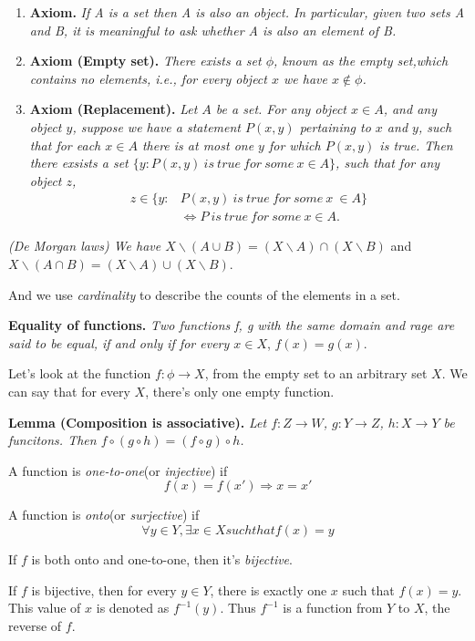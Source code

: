 \documentclass{article}
\begin{document}
\begin{enumerate}
	\item{
	      \textbf{Axiom.}
	      \emph{If A is a set then A is also an object.
		      In particular, given two sets A and B, it is meaningful to ask whether A is also an element of B.}
	      }
	\item{
	      \textbf{Axiom (Empty set).}
	      \emph{There exists a set \(\phi\), known as the empty set,which contains no elements, i.e., for every object \(x\) we have \(x \notin \phi\).}}
	\item{
	      \textbf{Axiom (Replacement).}
	      \emph{Let \(A\) be a set. For any object \(x \in A\), and any object \(y\), suppose we have a statement \(P(x, y)\) pertaining to \(x\) and \(y\),
		      such that for each \(x \in A\) there is at most one \(y\) for which \(P(x, y)\) is true.
		      Then there exsists a set \(\{y: P(x, y)\ is\ true\ for\ some\ x \in A\}\), such that for any object \(z\),
	      }
	      \[\begin{aligned}
			      z \in \{ y:{} & P(x, y)\ is\ true\ for\ some\ x\ \in A \}        \\
			                    & \Leftrightarrow P\ is\ true\ for\ some\ x \in A.
		      \end{aligned}\]
	      }
\end{enumerate}

\emph{(De Morgan laws) We have
	\(X \backslash (A \cup B) = (X \backslash A) \cap (X \backslash B)\)} and \(X \backslash (A \cap B) = (X \backslash A) \cup (X \backslash B)\).

And we use \emph{cardinality} to describe the counts of the elements in a set.


\textbf{Equality of functions.} \emph{Two functions f, g with the same domain and rage are said to be equal, if and only if for every \(x \in X\)}, \(f(x) = g(x)\).

Let's look at the function \(f: \phi \rightarrow X\), from the empty set to an arbitrary set \(X\).
We can say that for every \(X\), there's only one empty function.

\textbf{Lemma (Composition is associative).} \emph{
	Let \(f: Z \rightarrow W\), \(g: Y \rightarrow Z\), \(h: X \rightarrow Y\) be funcitons.
	Then \(f \circ (g \circ h)=(f \circ g) \circ h\).
}

A function is \emph{one-to-one}(or \emph{injective}) if \[
	f(x) = f(x') \Rightarrow x = x'
\]

A function is \emph{onto}(or \emph{surjective}) if \[
	\forall y \in Y, \exists x \in X such that f(x) = y
\]

If \(f\) is both onto and one-to-one, then it's \emph{bijective}.

If \(f\) is bijective, then for every \(y \in Y\), there is exactly one \(x\) such that \(f(x) = y\).
This value of \(x\) is denoted as \(f^{-1}(y)\).
Thus \(f^{-1}\) is a function from \(Y\) to \(X\), the reverse of \(f\).
\end{document}
